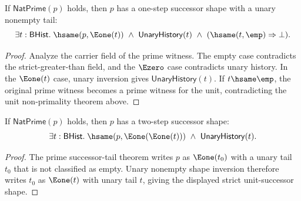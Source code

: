 \begin{theorem}
\label{thm:nat-prime-successor-tail-nonempty}
If $\mathsf{NatPrime}(p)$ holds, then $p$ has a one-step successor shape with a
unary nonempty tail:
$$
\exists t:\mathsf{BHist}.\;
\hsame(p,\Eone(t))\ \wedge\ \mathsf{UnaryHistory}(t)\ \wedge\
(\hsame(t,\emp)\Rightarrow\bot).
$$
\end{theorem}
\begin{proof}
Analyze the carrier field of the prime witness. The empty case contradicts the
strict-greater-than field, and the $\Ezero$ case contradicts unary history. In
the $\Eone(t)$ case, unary inversion gives $\mathsf{UnaryHistory}(t)$. If
$t\hsame\emp$, the original prime witness becomes a prime witness for the unit,
contradicting the unit non-primality theorem above.
\end{proof}

\begin{theorem}
\label{thm:nat-prime-strict-unit-successor-shape}
If $\mathsf{NatPrime}(p)$ holds, then $p$ has a two-step successor shape:
$$
\exists t:\mathsf{BHist}.\;
\hsame(p,\Eone(\Eone(t)))\ \wedge\ \mathsf{UnaryHistory}(t).
$$
\end{theorem}
\begin{proof}
The prime successor-tail theorem writes \(p\) as \(\Eone(t_0)\) with a unary
tail \(t_0\) that is not classified as empty. Unary nonempty shape inversion
therefore writes \(t_0\) as \(\Eone(t)\) with unary tail \(t\), giving the
displayed strict unit-successor shape.
\end{proof}

